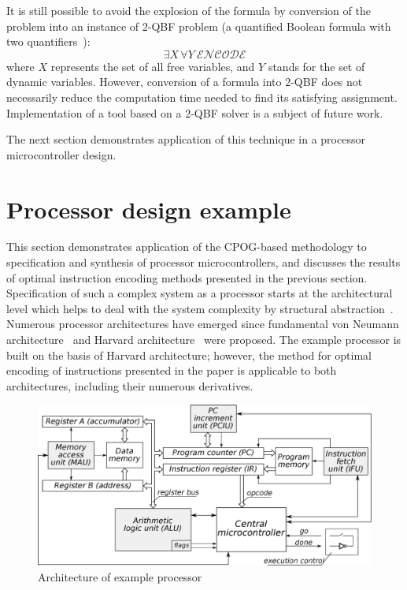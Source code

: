 It is still possible to avoid the explosion of the formula by conversion
of the problem into an instance of 2-QBF problem (a quantified Boolean
formula with two quantifiers~\cite{2004_ranjan_qbf}):
\[
\exists X\,\forall Y\ \mathcal{ENCODE}
\]
where $X$ represents the set of all free variables, and $Y$ stands
for the set of dynamic variables. However, conversion of a formula
into 2-QBF does not necessarily reduce the computation time needed
to find its satisfying assignment. Implementation of a tool based
on a 2-QBF solver is a subject of future work.

The next section demonstrates application of this technique in a processor
microcontroller design.


\section{Processor design example\label{sec-processor}
}

This section demonstrates application of the CPOG-based methodology
to specification and synthesis of processor microcontrollers, and
discusses the results of optimal instruction encoding methods presented
in the previous section. Specification of such a complex system as
a processor starts at the architectural level which helps to deal
with the system complexity by structural abstraction~\cite{1994_de_micheli_book}.
Numerous processor architectures have emerged since fundamental von
Neumann architecture\emph{~}\cite{1946_burks_architecture} and Harvard
architecture\emph{~}\cite{1946_aiken_calculator} were proposed.
The example processor is built on the basis of Harvard architecture;
however, the method for optimal encoding of instructions presented
in the paper is applicable to both architectures, including their
numerous derivatives.

\begin{figure}
\begin{centering}
\includegraphics[width=0.75\columnwidth]{fig/processor_architecture}

\par\end{centering}

\caption{Architecture of example processor\label{app-fig-Architecture-of-example}}
\end{figure}



